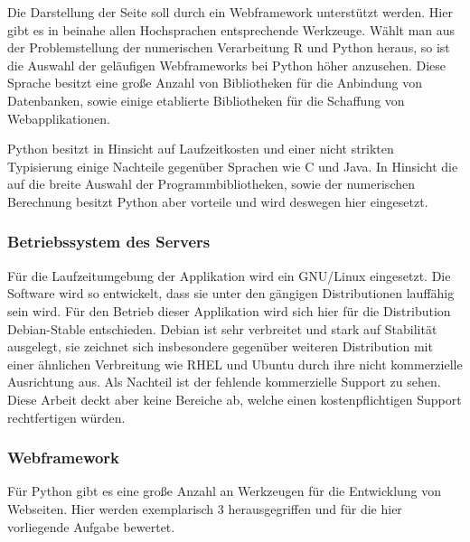Die Darstellung der Seite soll durch ein Webframework unterstützt werden. Hier gibt es in beinahe allen Hochsprachen entsprechende Werkzeuge. Wählt man aus der Problemstellung der numerischen Verarbeitung R und Python heraus, so ist die Auswahl der geläufigen Webframeworks bei Python höher anzusehen. Diese Sprache besitzt eine große Anzahl von Bibliotheken für die Anbindung von Datenbanken, sowie einige etablierte Bibliotheken für die Schaffung von Webapplikationen.

Python besitzt in Hinsicht auf Laufzeitkosten und einer nicht strikten Typisierung einige Nachteile gegenüber Sprachen wie C und Java. In Hinsicht die auf die breite Auswahl der  Programmbibliotheken, sowie der numerischen Berechnung besitzt Python aber vorteile und wird deswegen hier eingesetzt.



\subsubsection{Betriebssystem des Servers}


Für die Laufzeitumgebung der Applikation wird ein GNU/Linux eingesetzt. Die Software wird so entwickelt, dass sie unter den gängigen Distributionen lauffähig sein wird. Für den Betrieb dieser Applikation wird sich hier für die Distribution Debian-Stable entschieden. Debian ist sehr verbreitet und stark auf Stabilität ausgelegt, sie zeichnet sich insbesondere gegenüber weiteren Distribution mit einer ähnlichen Verbreitung wie RHEL und Ubuntu durch ihre nicht kommerzielle Ausrichtung aus.  Als Nachteil ist der fehlende kommerzielle Support zu sehen. Diese Arbeit deckt aber keine Bereiche ab, welche einen kostenpflichtigen Support rechtfertigen würden.

\subsubsection{Webframework}

Für Python gibt es eine große Anzahl an Werkzeugen für die Entwicklung von Webseiten. Hier werden exemplarisch 3 herausgegriffen und für die hier vorliegende Aufgabe bewertet.


